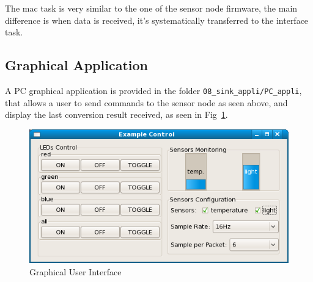 \documentclass[11pt]{report}
\begin{document}
The mac task is very similar to the one of the sensor node firmware, the main difference is when data is received, it's systematically transferred to the interface task.

\subsection{Graphical Application}
A PC graphical application is provided in the folder \verb$08_sink_appli/PC_appli$, that allows a user to send commands to the sensor node as seen above, and display the last conversion result received, as seen in Fig~\ref{fig:pcappli}.
\begin{figure}[ht]
\begin{center}
\includegraphics[scale=0.5]{figures/PC_appli.png}
\end{center}
\caption{Graphical User Interface}
\label{fig:pcappli}
\end{figure}
\end{document}
